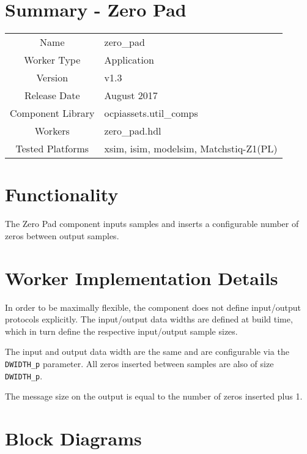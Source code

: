 \documentclass{article}
\author{} %
\date{Version \docVersion} %
\title{\docTitle}
\def\comp{zero\_pad}
\def\Comp{Zero Pad}
\begin{document}
\section*{Summary - \Comp}
\begin{tabular}{|c|M{13.5cm}|}
	\hline
	                  &                        \\
	\hline
	Name              & \comp                  \\
	\hline
	Worker Type       & Application            \\
	\hline
	Version           & v1.3                  \\
	\hline
	Release Date      & August 2017           \\
	\hline
	Component Library & ocpiassets.util\_comps \\
	\hline
	Workers           & \comp.hdl              \\
	\hline
	Tested Platforms  & xsim, isim, modelsim, Matchstiq-Z1(PL) \\
	\hline
\end{tabular}

\section*{Functionality}
\begin{flushleft}
	The \Comp{} component inputs samples and inserts a configurable number of zeros between output samples.
\end{flushleft}

\section*{Worker Implementation Details}
\begin{flushleft}
	In order to be maximally flexible, the component does not define input/output protocols explicitly. The input/output data widths are defined at build time, which in turn define the respective input/output sample sizes.\medskip
	
	The input and output data width are the same and are configurable via the \verb+DWIDTH_p+ parameter. All zeros inserted between samples are also of size \verb+DWIDTH_p+.\medskip
	
	The message size on the output is equal to the number of zeros inserted plus 1.
\end{flushleft}

\section*{Block Diagrams}
\end{document}
